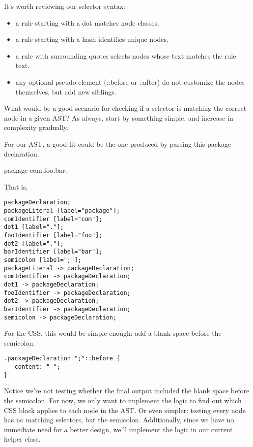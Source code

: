 \documentclass[11pt]{article}
\begin{document}
It's worth reviewing our selector syntax:

\begin{itemize}
\item a rule starting with a dot matches node classes.
\item a rule starting with a hash identifies unique nodes.
\item a rule with surrounding quotes selects nodes whose text matches the rule text.
\item any optional pseudo-element (::before or ::after) do not customize the nodes themselves, but add new siblings.
\end{itemize}

What would be a good scenario for checking if a selector is matching the correct node in a given AST? As always, start by
something simple, and increase in complexity gradually.

For our AST, a good fit could be the one produced by parsing this package declaration:

package com.foo.bar;

That is,

\begin{verbatim}
packageDeclaration;
packageLiteral [label="package"];
comIdentifier [label="com"];
dot1 [label="."];
fooIdentifier [label="foo"];
dot2 [label="."];
barIdentifier [label="bar"];
semicolon [label=";"];
packageLiteral -> packageDeclaration;
comIdentifier -> packageDeclaration;
dot1 -> packageDeclaration;
fooIdentifier -> packageDeclaration;
dot2 -> packageDeclaration;
barIdentifier -> packageDeclaration;
semicolon -> packageDeclaration;
\end{verbatim}

For the CSS, this would be simple enough: add a blank space before the semicolon.

\begin{verbatim}
.packageDeclaration ";"::before {
   content: " ";
}
\end{verbatim}

Notice we're not testing whether the final output included the blank space before the semicolon.
For now, we only want to implement the logic to find out which CSS block applies to each node in the AST. Or even simpler:
testing every node has no matching selectors, but the semicolon. Additionally, since we have no immediate need for a better
design, we'll implement the logic in our current helper class.
\end{document}
